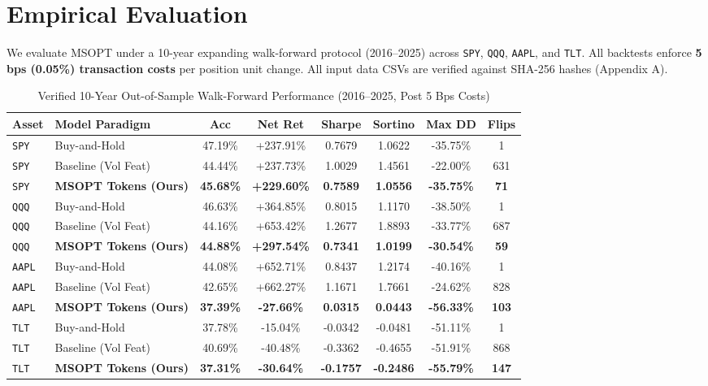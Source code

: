 \documentclass[10pt,journal,compsoc]{IEEEtran}
\begin{document}
\section{Empirical Evaluation}
We evaluate MSOPT under a 10-year expanding walk-forward protocol (2016--2025) across \texttt{SPY}, \texttt{QQQ}, \texttt{AAPL}, and \texttt{TLT}. All backtests enforce \textbf{5 bps (0.05\%) transaction costs} per position unit change. All input data CSVs are verified against SHA-256 hashes (Appendix A).

\begin{table}[ht]
\caption{Verified 10-Year Out-of-Sample Walk-Forward Performance (2016--2025, Post 5 Bps Costs)}
\label{tab:master_results}
\centering
\small
\begin{tabular}{llcccccc}
\toprule
\textbf{Asset} & \textbf{Model Paradigm} & \textbf{Acc} & \textbf{Net Ret} & \textbf{Sharpe} & \textbf{Sortino} & \textbf{Max DD} & \textbf{Flips} \\
\midrule
\texttt{SPY} & Buy-and-Hold & 47.19\% & +237.91\% & 0.7679 & 1.0622 & -35.75\% & 1 \\
\texttt{SPY} & Baseline (Vol Feat) & 44.44\% & +237.73\% & 1.0029 & 1.4561 & -22.00\% & 631 \\
\texttt{SPY} & \textbf{MSOPT Tokens (Ours)} & \textbf{45.68\%} & \textbf{+229.60\%} & \textbf{0.7589} & \textbf{1.0556} & \textbf{-35.75\%} & \textbf{71} \\
\midrule
\texttt{QQQ} & Buy-and-Hold & 46.63\% & +364.85\% & 0.8015 & 1.1170 & -38.50\% & 1 \\
\texttt{QQQ} & Baseline (Vol Feat) & 44.16\% & +653.42\% & 1.2677 & 1.8893 & -33.77\% & 687 \\
\texttt{QQQ} & \textbf{MSOPT Tokens (Ours)} & \textbf{44.88\%} & \textbf{+297.54\%} & \textbf{0.7341} & \textbf{1.0199} & \textbf{-30.54\%} & \textbf{59} \\
\midrule
\texttt{AAPL} & Buy-and-Hold & 44.08\% & +652.71\% & 0.8437 & 1.2174 & -40.16\% & 1 \\
\texttt{AAPL} & Baseline (Vol Feat) & 42.65\% & +662.27\% & 1.1671 & 1.7661 & -24.62\% & 828 \\
\texttt{AAPL} & \textbf{MSOPT Tokens (Ours)} & \textbf{37.39\%} & \textbf{-27.66\%} & \textbf{0.0315} & \textbf{0.0443} & \textbf{-56.33\%} & \textbf{103} \\
\midrule
\texttt{TLT} & Buy-and-Hold & 37.78\% & -15.04\% & -0.0342 & -0.0481 & -51.11\% & 1 \\
\texttt{TLT} & Baseline (Vol Feat) & 40.69\% & -40.48\% & -0.3362 & -0.4655 & -51.91\% & 868 \\
\texttt{TLT} & \textbf{MSOPT Tokens (Ours)} & \textbf{37.31\%} & \textbf{-30.64\%} & \textbf{-0.1757} & \textbf{-0.2486} & \textbf{-55.79\%} & \textbf{147} \\
\bottomrule
\end{tabular}
\end{table}
\end{document}
